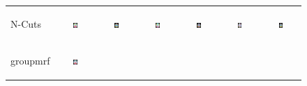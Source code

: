 \documentclass[serif]{beamer}
\begin{document}
\begin{frame}
\begin{figure}[htb]
\begin{tabular}{lcc|cc|cc}
\begin{sideways} \footnotesize \textsf{N-Cuts} \end{sideways} &
\includegraphics[width=0.13\textwidth]{figure2/ncuts_grp_z25} &
\includegraphics[width=0.13\textwidth]{figure2/ncuts_grp_z32} &
\includegraphics[width=0.13\textwidth]{figure2/ncuts_sub1_z25} &
\includegraphics[width=0.13\textwidth]{figure2/ncuts_sub1_z32} &
\includegraphics[width=0.13\textwidth]{figure2/ncuts_sub2_z25} &
\includegraphics[width=0.13\textwidth]{figure2/ncuts_sub2_z32} \\
\begin{sideways} \footnotesize \textsf{groupmrf} \end{sideways} &
\includegraphics[width=0.13\textwidth]{figure2/mrf_grp_z25} &

\end{tabular}
\end{figure}
\end{frame}
\end{document}
